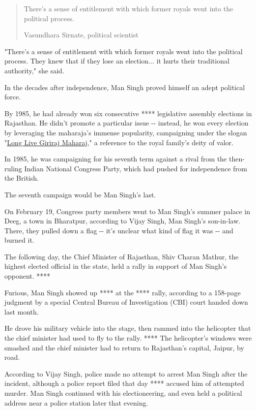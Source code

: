 \begin{quote}
There's a sense of entitlement with which former royals went into the
political process.

Vasundhara Sirnate, political scientist
\end{quote}

"There's a sense of entitlement with which former royals went into the
political process. They knew that if they lose an election... it hurts
their traditional authority," she said.

In the decades after independence, Man Singh proved himself an adept
political force.

By 1985, he had already won six consecutive **** legislative assembly
elections in Rajasthan. He didn't promote a particular issue -\/-
instead, he won every election by leveraging the maharaja's immense
popularity, campaigning under the slogan
"\href{https://apnews.com/123aa36b7984f59d6409a50a6b3b659b}{Long Live
Giriraj Maharaj}," a reference to the royal family's deity of valor.

In 1985, he was campaigning for his seventh term against a rival from
the then-ruling Indian National Congress Party, which had pushed for
independence from the British.

The seventh campaign would be Man Singh's last.

On February 19, Congress party members went to Man Singh's summer palace
in Deeg, a town in Bharatpur, according to Vijay Singh, Man Singh's
son-in-law. There, they pulled down a flag -\/- it's unclear what kind
of flag it was -\/- and burned it.

The following day, the Chief Minister of Rajasthan, Shiv Charan Mathur,
the highest elected official in the state, held a rally in support of
Man Singh's opponent. ****

Furious, Man Singh showed up **** at the **** rally, according to a
158-page judgment by a special Central Bureau of Investigation (CBI)
court handed down last month.

He drove his military vehicle into the stage, then rammed into the
helicopter that the chief minister had used to fly to the rally. ****
The helicopter's windows were smashed and the chief minister had to
return to Rajasthan's capital, Jaipur, by road.

According to Vijay Singh, police made no attempt to arrest Man Singh
after the incident, although a police report filed that day **** accused
him of attempted murder. Man Singh continued with his electioneering,
and even held a political address near a police station later that
evening.

